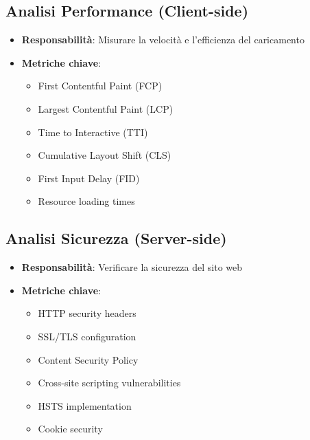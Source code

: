 \subsection{Analisi Performance (Client-side)}
\begin{itemize}
    \item \textbf{Responsabilità}: Misurare la velocità e l'efficienza del caricamento
    \item \textbf{Metriche chiave}:
    \begin{itemize}
        \item First Contentful Paint (FCP)
        \item Largest Contentful Paint (LCP)
        \item Time to Interactive (TTI)
        \item Cumulative Layout Shift (CLS)
        \item First Input Delay (FID)
        \item Resource loading times
    \end{itemize}
\end{itemize}

\subsection{Analisi Sicurezza (Server-side)}
\begin{itemize}
    \item \textbf{Responsabilità}: Verificare la sicurezza del sito web
    \item \textbf{Metriche chiave}:
    \begin{itemize}
        \item HTTP security headers
        \item SSL/TLS configuration
        \item Content Security Policy
        \item Cross-site scripting vulnerabilities
        \item HSTS implementation
        \item Cookie security
    \end{itemize}
\end{itemize}

